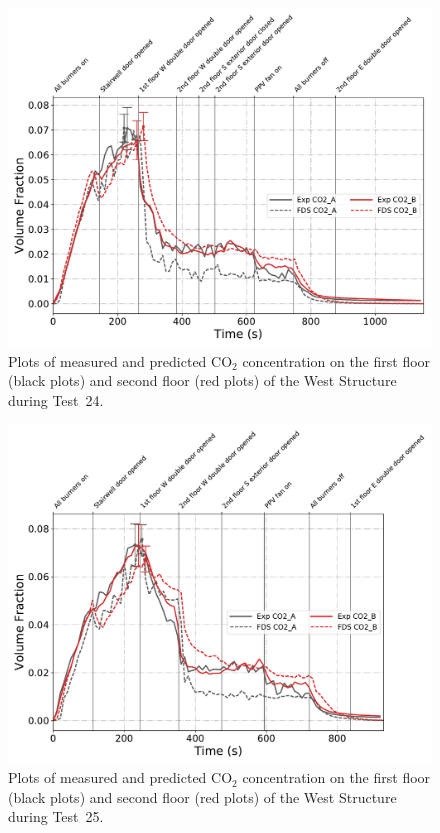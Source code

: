 \begin{figure}[!h]
	\centering
	\includegraphics[width=\columnwidth]{Figures/Plots/Validation/Gas_Concentration/Test_24_CO2}
	\caption[Plots of measured and predicted CO$_2$ concentration during Test~24.]{Plots of measured and predicted CO$_2$ concentration on the first floor (black plots) and second floor (red plots) of the West Structure during Test~24.}
	\label{fig:Test24_CO2}
\end{figure}

\begin{figure}[!h]
	\centering
	\includegraphics[width=\columnwidth]{Figures/Plots/Validation/Gas_Concentration/Test_25_CO2}
	\caption[Plots of measured and predicted CO$_2$ concentration during Test~25.]{Plots of measured and predicted CO$_2$ concentration on the first floor (black plots) and second floor (red plots) of the West Structure during Test~25.}
	\label{fig:Test25_CO2}
\end{figure}

